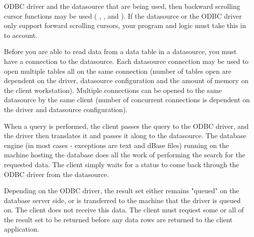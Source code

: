 \begin{twocollist}
{ODBC driver and the datasource that are being used, then backward 
scrolling cursor functions may be used (
, 
, and 
).  If the datasource or the 
ODBC driver only support forward scrolling cursors, your program and logic 
must take this in to account.}
\end{twocollist}

Before you are able to read data from a data table in a datasource, you must 
have a connection to the datasource.  Each datasource connection may be used 
to open multiple tables all on the same connection (number of tables open are 
dependent on the driver, datasource configuration and the amount of memory on 
the client workstation).  Multiple connections can be opened to the same 
datasource by the same client (number of concurrent connections is dependent 
on the driver and datasource configuration).

When a query is performed, the client passes the query to the ODBC driver, 
and the driver then translates it and passes it along to the datasource.  The 
database engine (in most cases - exceptions are text and dBase files) running 
on the machine hosting the database does all the work of performing the search 
for the requested data.  The client simply waits for a status to come back 
through the ODBC driver from the datasource.  

Depending on the ODBC driver, the result set either remains "queued" on the 
database server side, or is transferred to the machine that the driver is 
queued on.  The client does not receive this data.  The client must request 
some or all of the result set to be returned before any data rows are 
returned to the client application.

